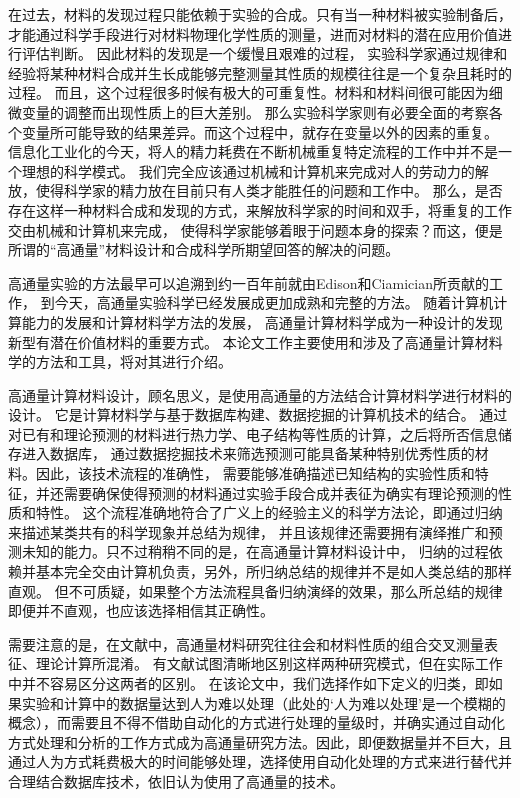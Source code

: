 在过去，材料的发现过程只能依赖于实验的合成。只有当一种材料被实验制备后，
才能通过科学手段进行对材料物理化学性质的测量，进而对材料的潜在应用价值进行评估判断。
因此材料的发现是一个缓慢且艰难的过程，
实验科学家通过规律和经验将某种材料合成并生长成能够完整测量其性质的规模往往是一个复杂且耗时的过程。
而且，这个过程很多时候有极大的可重复性。材料和材料间很可能因为细微变量的调整而出现性质上的巨大差别。
那么实验科学家则有必要全面的考察各个变量所可能导致的结果差异。而这个过程中，就存在变量以外的因素的重复。
信息化工业化的今天，将人的精力耗费在不断机械重复特定流程的工作中并不是一个理想的科学模式。
我们完全应该通过机械和计算机来完成对人的劳动力的解放，使得科学家的精力放在目前只有人类才能胜任的问题和工作中。
那么，是否存在这样一种材料合成和发现的方式，来解放科学家的时间和双手，将重复的工作交由机械和计算机来完成，
使得科学家能够着眼于问题本身的探索？而这，便是所谓的“高通量”材料设计和合成科学所期望回答的解决的问题。

高通量实验的方法最早可以追溯到约一百年前就由Edison和Ciamician\cite{ciamician1912photochemistry}所贡献的工作，
到今天，高通量实验科学已经发展成更加成熟和完整的方法\cite{curtarolo2003predicting,ceder1998identification,johannesson2002combined,curtarolo2005accuracy,xiang1995combinatorial,koinuma2004combinatorial,takeuchi2003identification}。
随着计算机计算能力的发展和计算材料学方法的发展，
高通量计算材料学成为一种设计的发现新型有潜在价值材料的重要方式。
本论文工作主要使用和涉及了高通量计算材料学的方法和工具，将对其进行介绍。

高通量计算材料设计，顾名思义，是使用高通量的方法结合计算材料学进行材料的设计。
它是计算材料学与基于数据库构建、数据挖掘的计算机技术的结合。
通过对已有和理论预测的材料进行热力学、电子结构等性质的计算，之后将所否信息储存进入数据库，
通过数据挖掘技术来筛选预测可能具备某种特别优秀性质的材料。因此，该技术流程的准确性，
需要能够准确描述已知结构的实验性质和特征，并还需要确保使得预测的材料通过实验手段合成并表征为确实有理论预测的性质和特性。
这个流程准确地符合了广义上的经验主义的科学方法论，即通过归纳来描述某类共有的科学现象并总结为规律，
并且该规律还需要拥有演绎推广和预测未知的能力。只不过稍稍不同的是，在高通量计算材料设计中，
归纳的过程依赖并基本完全交由计算机负责，另外，所归纳总结的规律并不是如人类总结的那样直观。
但不可质疑，如果整个方法流程具备归纳演绎的效果，那么所总结的规律即便并不直观，也应该选择相信其正确性。

需要注意的是，在文献中，高通量材料研究往往会和材料性质的组合交叉测量表征、理论计算所混淆。
有文献\cite{maclean1999glossary,maier2007combinatorial}试图清晰地区别这样两种研究模式，但在实际工作中并不容易区分这两者的区别。
在该论文中，我们选择作如下定义的归类，即如果实验和计算中的数据量达到人为难以处理（此处的‘人为难以处理’是一个模糊的概念），而需要且不得不借助自动化的方式进行处理的量级时，并确实通过自动化方式处理和分析的工作方式成为高通量研究方法。因此，即便数据量并不巨大，且通过人为方式耗费极大的时间能够处理，选择使用自动化处理的方式来进行替代并合理结合数据库技术，依旧认为使用了高通量的技术。

